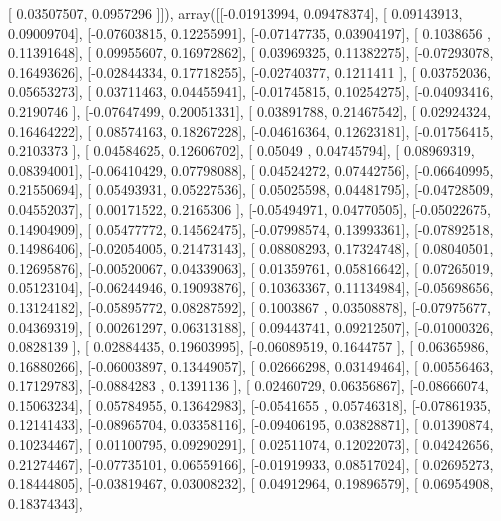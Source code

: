 \documentclass{article}
\begin{document}
       [ 0.03507507,  0.0957296 ]]), array([[-0.01913994,  0.09478374],
       [ 0.09143913,  0.09009704],
       [-0.07603815,  0.12255991],
       [-0.07147735,  0.03904197],
       [ 0.1038656 ,  0.11391648],
       [ 0.09955607,  0.16972862],
       [ 0.03969325,  0.11382275],
       [-0.07293078,  0.16493626],
       [-0.02844334,  0.17718255],
       [-0.02740377,  0.1211411 ],
       [ 0.03752036,  0.05653273],
       [ 0.03711463,  0.04455941],
       [-0.01745815,  0.10254275],
       [-0.04093416,  0.2190746 ],
       [-0.07647499,  0.20051331],
       [ 0.03891788,  0.21467542],
       [ 0.02924324,  0.16464222],
       [ 0.08574163,  0.18267228],
       [-0.04616364,  0.12623181],
       [-0.01756415,  0.2103373 ],
       [ 0.04584625,  0.12606702],
       [ 0.05049   ,  0.04745794],
       [ 0.08969319,  0.08394001],
       [-0.06410429,  0.07798088],
       [ 0.04524272,  0.07442756],
       [-0.06640995,  0.21550694],
       [ 0.05493931,  0.05227536],
       [ 0.05025598,  0.04481795],
       [-0.04728509,  0.04552037],
       [ 0.00171522,  0.2165306 ],
       [-0.05494971,  0.04770505],
       [-0.05022675,  0.14904909],
       [ 0.05477772,  0.14562475],
       [-0.07998574,  0.13993361],
       [-0.07892518,  0.14986406],
       [-0.02054005,  0.21473143],
       [ 0.08808293,  0.17324748],
       [ 0.08040501,  0.12695876],
       [-0.00520067,  0.04339063],
       [ 0.01359761,  0.05816642],
       [ 0.07265019,  0.05123104],
       [-0.06244946,  0.19093876],
       [ 0.10363367,  0.11134984],
       [-0.05698656,  0.13124182],
       [-0.05895772,  0.08287592],
       [ 0.1003867 ,  0.03508878],
       [-0.07975677,  0.04369319],
       [ 0.00261297,  0.06313188],
       [ 0.09443741,  0.09212507],
       [-0.01000326,  0.0828139 ],
       [ 0.02884435,  0.19603995],
       [-0.06089519,  0.1644757 ],
       [ 0.06365986,  0.16880266],
       [-0.06003897,  0.13449057],
       [ 0.02666298,  0.03149464],
       [ 0.00556463,  0.17129783],
       [-0.0884283 ,  0.1391136 ],
       [ 0.02460729,  0.06356867],
       [-0.08666074,  0.15063234],
       [ 0.05784955,  0.13642983],
       [-0.0541655 ,  0.05746318],
       [-0.07861935,  0.12141433],
       [-0.08965704,  0.03358116],
       [-0.09406195,  0.03828871],
       [ 0.01390874,  0.10234467],
       [ 0.01100795,  0.09290291],
       [ 0.02511074,  0.12022073],
       [ 0.04242656,  0.21274467],
       [-0.07735101,  0.06559166],
       [-0.01919933,  0.08517024],
       [ 0.02695273,  0.18444805],
       [-0.03819467,  0.03008232],
       [ 0.04912964,  0.19896579],
       [ 0.06954908,  0.18374343],
\end{document}
